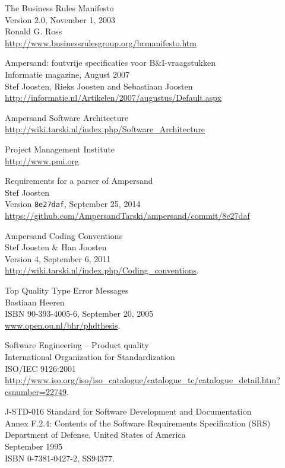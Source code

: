 \label{sec:bibliography}

\begin{thebibliography}{99}

	The Business Rules Manifesto\\
	Version 2.0, November 1, 2003\\
	Ronald G. Ross\\
	\url{http://www.businessrulesgroup.org/brmanifesto.htm}
	
	Ampersand: foutvrije specificaties voor B\&I-vraagstukken\\
	Informatie magazine, August 2007\\
	Stef Joosten, Rieks Joosten and Sebastiaan Joosten\\
	\url{http://informatie.nl/Artikelen/2007/augustus/Default.aspx}  %
	
	Ampersand Software Architecture\\
	\url{http://wiki.tarski.nl/index.php/Software_Architecture}
	
	Project Management Institute\\
	\url{http://www.pmi.org}
	
	Requirements for a parser of Ampersand\\
	Stef Joosten\\
	Version \texttt{8e27daf}, September 25, 2014\\
	\url{https://github.com/AmpersandTarski/ampersand/commit/8e27daf}
	
	Ampersand Coding Conventions\\
	Stef Joosten \& Han Joosten\\
	Version 4, September 6, 2011\\
	\url{http://wiki.tarski.nl/index.php/Coding\_conventions}.

	Top Quality Type Error Messages\\
	Bastiaan Heeren\\
	ISBN 90-393-4005-6, September 20, 2005\\
	\url{www.open.ou.nl/bhr/phdthesis}.
	
	Software Engineering -- Product quality\\
	International Organization for Standardization\\
	ISO/IEC 9126:2001\\
	\url{http://www.iso.org/iso/iso_catalogue/catalogue_tc/catalogue_detail.htm?csnumber=22749}.

	J-STD-016 Standard for Software Development and Documentation\\
	Annex F.2.4: Contents of the Software Requirements Specification (SRS)\\
	Department of Defense, United States of America\\
	September 1995\\
	ISBN 0-7381-0427-2, SS94377.

\end{thebibliography}